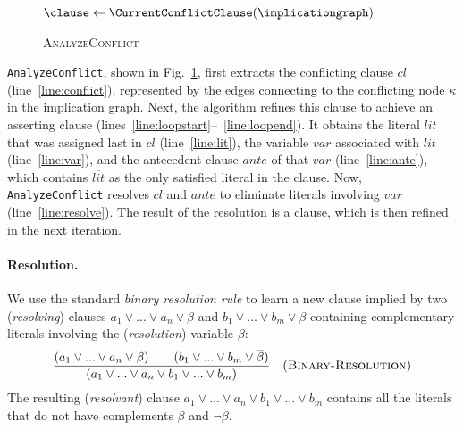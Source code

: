 \documentclass[oneside,11pt,dvipsnames]{book}
\numberwithin{equation}{section}
\theoremstyle{definition}
\theoremstyle{remark}
\begin{document}
\begin{figure}
\begin{minipage}{\linewidth}
\vspace{-0.2in}
\begin{algorithm}[H]
    \small
    \Output{\clause}
    \BlankLine
    $\clause \gets \CurrentConflictClause(\implicationgraph)$\;\label{line:conflict}
    \While{$\neg \StopCriterion(\clause)$}{\label{line:loopstart}
      $\literal \gets \LastAssignedLiteral(\implicationgraph, \clause)$\;\label{line:lit}
      $\variable \gets \LiteralToVariable(\literal)$\;\label{line:var}
      $\antecedent \gets \Antecedent(\implicationgraph,\literal)$\;\label{line:ante}
      $\clause \gets \BinRes(\clause, \antecedent, \variable)$\;\label{line:resolve}
    }\label{line:loopend}
    \Return{$\clause$}
    \caption{\textsc{AnalyzeConflict}}\label{alg:conflict}
  \end{algorithm}
  \end{minipage}
\end{figure}
\texttt{AnalyzeConflict}, shown in Fig.~\ref{alg:conflict}, first extracts the conflicting clause $cl$ (line~\ref{line:conflict}), represented by the edges connecting to the conflicting node $\kappa$ in the implication graph.
Next, the algorithm refines this clause to achieve an asserting clause (lines~\ref{line:loopstart}--~\ref{line:loopend}).
It obtains the literal $lit$ that was assigned last in $cl$ (line~\ref{line:lit}), the variable $var$ associated with $lit$ (line~\ref{line:var}), and the antecedent clause $ante$ of that $var$ (line~\ref{line:ante}), which contains $\overline{lit}$ as the only satisfied literal in the clause. Now, \texttt{AnalyzeConflict} resolves $cl$ and $ante$ to eliminate literals involving $var$ (line~\ref{line:resolve}). The result of the resolution is a clause, which is then refined in the next iteration.

\paragraph{Resolution.} We use the standard \emph{binary resolution rule} to learn a new clause implied by two (\emph{resolving}) clauses $a_1 \lor ... \lor a_n \lor \beta$ and $b_1 \lor ... \lor b_m \lor \overline{\beta}$ containing complementary literals involving the (\emph{resolution}) variable $\beta$:
\begin{equation} \label{eq:binary-resolution}
    \frac{(a_1 \lor ... \lor a_n \lor \beta) \quad \quad (b_1 \lor ... \lor b_m \lor \overline{\beta})}{(a_1 \lor ... \lor a_n \lor b_1 \lor ... \lor b_m)} \quad  (\textsc{Binary-Resolution})
\end{equation}
The resulting (\emph{resolvant}) clause $a_1 \lor ... \lor a_n \lor b_1 \lor ... \lor b_m$ contains all the literals that do not have complements $\beta$ and $\neg{\beta}$.
\end{document}

